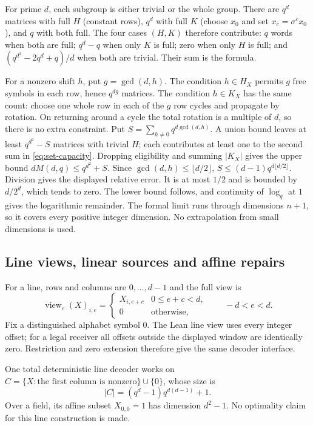 \begin{outline}
For prime $d$, each subgroup is either trivial or the whole group. There
are $q^d$ matrices with full $H$ (constant rows), $q^d$ with full $K$
(choose $x_0$ and set $x_c=\sigma^cx_0$), and $q$ with both full. The
four cases $(H,K)$ therefore contribute: $q$ words when both are full;
$q^d-q$ when only $K$ is full; zero when only $H$ is full; and
$(q^{d^2}-2q^d+q)/d$ when both are trivial. Their sum is the formula.

For a nonzero shift $h$, put $g=\gcd(d,h)$. The condition $h\in H_X$
permits $g$ free symbols in each row, hence $q^{dg}$ matrices. The
condition $h\in K_X$ has the same count: choose one whole row in each of
the $g$ row cycles and propagate by rotation. On returning around a cycle
the total rotation is a multiple of $d$, so there is no extra constraint.
Put $S=\sum_{h\ne0}q^{d\gcd(d,h)}$. A union bound leaves at least
$q^{d^2}-S$ matrices with trivial $H$; each contributes at least one to
the second sum in \cref{eq:set-capacity}. Dropping eligibility and summing
$|K_X|$ gives the upper bound $dM(d,q)\le q^{d^2}+S$.
Since $\gcd(d,h)\le\lfloor d/2\rfloor$,
$S\le(d-1)q^{d\lfloor d/2\rfloor}$. Division gives the displayed relative
error. It is at most $1/2$ and is bounded by $d/2^d$, which tends to zero.
The lower bound follows, and continuity of $\log_q$ at $1$ gives the
logarithmic remainder. The formal limit runs through dimensions $n+1$,
so it covers every positive integer dimension. No extrapolation from
small dimensions is used.
\end{outline}

\subsection{Line views, linear sources and affine repairs}

For a line, rows and columns are $0,\ldots,d-1$ and the full view is
\[
 \operatorname{view}_c(X)_{i,e}=
 \begin{cases}X_{i,e+c}&0\le e+c<d,\\0&\text{otherwise},\end{cases}
 \qquad -d<e<d.
\]
Fix a distinguished alphabet symbol $0$. The Lean line view uses every
integer offset; for a legal receiver all offsets outside the displayed
window are identically zero. Restriction and zero extension therefore
give the same decoder interface.

\begin{proposition}\label{prop:line-marker}
One total deterministic line decoder works on
$C=\{X:\text{the first column is nonzero}\}\cup\{0\}$, whose size is
\[
 |C|=(q^d-1)q^{d(d-1)}+1.
\]
Over a field, its affine subset $X_{0,0}=1$ has dimension $d^2-1$.
No optimality claim for this line construction is made.
\end{proposition}

